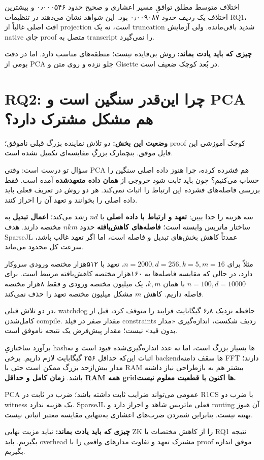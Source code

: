 \documentclass[11pt,a4paper]{article}
\newcommand{\lesson}[1]{\clearpage\section{#1}}
\newcommand{\takeaway}[1]{\par\textbf{چیزی که باید یادت بماند:} #1\par}
\newcommand{\status}[1]{\textbf{وضعیت این بخش:} #1\par}
\begin{document}
اختلاف متوسط مطلق توافقِ مسیر اعشاری و صحیح حدود ۰٫۰۰۰۵۴۶ و بیشترین اختلاف یک ردیف حدود ۰٫۰۰۹۰۸۷ بود. این شواهد نشان می‌دهند در تنظیمات RQ1، افت اصلی غالباً از projection است، نه یک truncation شدید باقی‌مانده. ولی آزمایش native جای proof متصل به transcript را نمی‌گیرد.

\takeaway{روش بی‌فایده نیست؛ منطقه‌های مناسب دارد. اما در دقت بومی از PCA جلو نزده و روی متن و Gisette در بُعد کوچک ضعیف است.}

\lesson{RQ2: چرا این‌قدر سنگین است و PCA هم مشکل مشترک دارد؟}
\status{دو تلاش نماینده بزرگ قبلی ناموفق؛ proof کوچک آموزشی این فایل موفق. بنچمارک بزرگِ مقایسه‌ای تکمیل نشده است.}
سؤال تو درست است: وقتی PCA هم فشرده کرده، چرا هنوز داده اصلی سنگین را حساب می‌کنیم؟ چون باید ثابت شود خروجی از \textbf{همان داده متعهدشده} آمده است. فقط بررسی فاصله‌های فشرده این ارتباط را اثبات نمی‌کند. هر دو روش در تعریف فعلی باید داده اصلی را بخوانند و تعهد آن را احراز کنند.

سه هزینه را جدا ببین: \textbf{تعهد و ارتباط با داده اصلی} با \(nd\) رشد می‌کند؛ \textbf{اعمال تبدیل} به ساختار ماتریس وابسته است؛ \textbf{فاصله‌های کاهش‌یافته} حدود \(nkm\) مختصه دارند. هدف SparseJL عمدتاً کاهش بخش‌های تبدیل و فاصله است، اما اگر تعهد غالب باشد، سرعت کل محدود می‌ماند.

مثلاً برای \(n=2000,d=256,k=5,m=16\)، تعهد با ۵۱۲هزار مختصه ورودی سروکار دارد، در حالی که مقایسه فاصله‌ها به ۱۶۰هزار مختصه کاهش‌یافته مرتبط است. برای \(n=100,d=10000\) با همان \(k,m\)، یک میلیون مختصه ورودی و فقط ۸هزار مختصه فاصله داریم. کاهش \(m\) مشکل میلیون مختصه تعهد را حذف نمی‌کند.

در دو تلاش قبلی، watchdog حافظه نزدیک ۶٫۸ گیگابایت فرایند را متوقف کرد، قبل از کامل‌شدن compile. مقدار صفر در فیلد constraints ردیف شکست، اندازه‌گیری «مدار بدون قید» نیست؛ مقدار پیش‌فرض یک نتیجه ناموفق است.

برآورد ساختاریِ hashها بسیار بزرگ است، اما نه عدد اندازه‌گیری‌شده قیود است و نه اثبات این‌که حداقل ۲۵۶ گیگابایت لازم داریم. برخی backendها سقف دامنه FFT دارند؛ مدار بیش‌ازحد بزرگ ممکن است حتی با RAM بیشتر هم به بازطراحی نیاز داشته باشد. \textbf{زمان کامل و حداقل RAM همه gridها اکنون با قطعیت معلوم نیست.}

PCA عمومی می‌تواند ضرایب ثابت داشته باشد؛ ضرب در ثابت در R1CS با ضرب دو witness یک هزینه ندارد. SparseJL فعلی ماتریس شاهد و احراز دارد و routing آن هنوز بهینه نیست. بنابراین شمردن ضرب‌های اعشاری به‌تنهایی مقایسه معتبر اثباتی نیست.

\takeaway{نباید مزیت نهایی ZK را از کاهش مختصات یا RQ1 نتیجه بگیریم. باید overhead مشترک تعهد و تفاوت مدارهای واقعی را با proof موفق اندازه بگیریم.}
\end{document}
